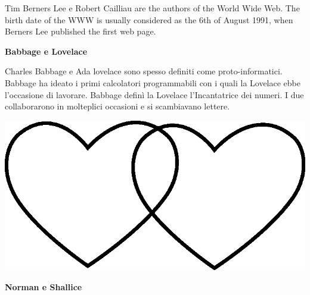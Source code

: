 \documentclass[11pt]{extarticle}
\begin{document}
\begin{center}
Tim Berners Lee e Robert Cailliau are the authors of the World Wide Web. The birth date of the WWW is usually considered as the 6th of August 1991, when Berners Lee published the first web page.\\
\end{center}
\vspace*{\fill}
\newpage
\begin{center}
\vspace*{\fill}
{\Huge \textbf{Babbage e Lovelace\\}}
\vspace*{\fill}
\end{center}
\newpage
{}
\vspace*{\fill}
\begin{center}
Charles Babbage e Ada lovelace sono spesso definiti come proto-informatici. Babbage ha ideato i primi calcolatori programmabili con i quali la Lovelace ebbe l'occasione di lavorare. Babbage definì la Lovelace l'Incantatrice dei numeri. I due collaborarono in molteplici occasioni e si scambiavano lettere.\\
\begin{center}
\includegraphics[scale=0.1]{img/cuori_venn.eps}\\
\end{center}
\end{center}
\vspace*{\fill}
\newpage
\begin{center}
\vspace*{\fill}
{\Huge \textbf{Norman e Shallice\\}}
\vspace*{\fill}
\end{center}
\end{document}
